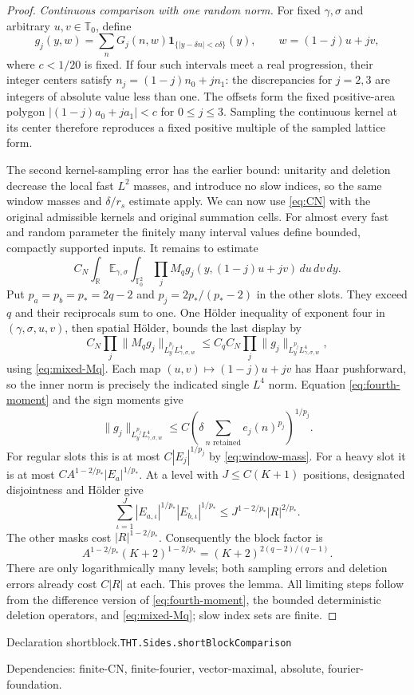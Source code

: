 \documentclass[11pt]{article}
\theoremstyle{definition}
\newcommand{\R}{\mathbb R}
\newcommand{\T}{\mathbb T}
\newcommand{\E}{\mathbb E}
\newcommand{\one}{\mathbf 1}
\numberwithin{equation}{section}
\newcommand{\bp}[3]{\par\smallskip\begingroup\footnotesize
\noindent\hypertarget{bp:#1}{\textsf{Declaration #1.}}\quad\nolinkurl{#2}\par
\noindent\textsf{Dependencies:} #3.\par\endgroup\smallskip}
\begin{document}
\begin{proof}
\emph{Continuous comparison with one random norm.} For fixed $\gamma,\sigma$ and arbitrary $u,v\in\T_0$, define
\[
 g_j(y,w)=\sum_nG_j(n,w)\one_{\{|y-\delta n|<c\delta\}}(y),
 \qquad w=(1-j)u+jv,
\]
where $c<1/20$ is fixed. If four such intervals meet a real progression, their integer centers satisfy $n_j=(1-j)n_0+jn_1$: the discrepancies for $j=2,3$ are integers of absolute value less than one. The offsets form the fixed positive-area polygon $|(1-j)a_0+ja_1|<c$ for $0\le j\le3$. Sampling the continuous kernel at its center therefore reproduces a fixed positive multiple of the sampled lattice form.

The second kernel-sampling error has the earlier bound: unitarity and deletion decrease the local fast $L^2$ masses, and introduce no slow indices, so the same window masses and $\delta/r_s$ estimate apply. We can now use \eqref{eq:CN} with the original admissible kernels and original summation cells. For almost every fast and random parameter the finitely many interval values define bounded, compactly supported inputs. It remains to estimate
\[
 C_N\int_{\R}\E_{\gamma,\sigma}\int_{\T_0^2}
       \prod_jM_qg_j(y,(1-j)u+jv)\,du\,dv\,dy.
\]
Put $p_a=p_b=p_*=2q-2$ and $p_j=2p_*/(p_*-2)$ in the other slots. They exceed $q$ and their reciprocals sum to one. One H\"older inequality of exponent four in $(\gamma,\sigma,u,v)$, then spatial H\"older, bounds the last display by
\[
 C_N\prod_j\|M_qg_j\|_{L_y^{p_j}L_{\gamma,\sigma,w}^4}
 \le C_qC_N\prod_j\|g_j\|_{L_y^{p_j}L_{\gamma,\sigma,w}^4},
\]
using \eqref{eq:mixed-Mq}. Each map $(u,v)\mapsto(1-j)u+jv$ has Haar pushforward, so the inner norm is precisely the indicated single $L^4$ norm. Equation \eqref{eq:fourth-moment} and the sign moments give
\[
 \|g_j\|_{L_y^{p_j}L_{\gamma,\sigma,w}^4}
 \le C\left(\delta\sum_{n\text{ retained}}e_j(n)^{p_j}\right)^{1/p_j}.
\]
For regular slots this is at most $C|E_j|^{1/p_j}$ by \eqref{eq:window-mass}. For a heavy slot it is at most $CA^{1-2/p_*}|E_a|^{1/p_*}$. At a level with $J\le C(K+1)$ positions, designated disjointness and H\"older give
\[
 \sum_{\iota=1}^J|E_{a,\iota}|^{1/p_*}|E_{b,\iota}|^{1/p_*}
 \le J^{1-2/p_*}|R|^{2/p_*}.
\]
The other masks cost $|R|^{1-2/p_*}$. Consequently the block factor is
\[
 A^{1-2/p_*}(K+2)^{1-2/p_*}
 =(K+2)^{2(q-2)/(q-1)}.
\]
There are only logarithmically many levels; both sampling errors and deletion errors already cost $C|R|$ at each. This proves the lemma. All limiting steps follow from the difference version of \eqref{eq:fourth-moment}, the bounded deterministic deletion operators, and \eqref{eq:mixed-Mq}; slow index sets are finite.
\end{proof}
\bp{shortblock}{THT.Sides.shortBlockComparison}{finite-CN, finite-fourier, vector-maximal, absolute, fourier-foundation}
\end{document}
